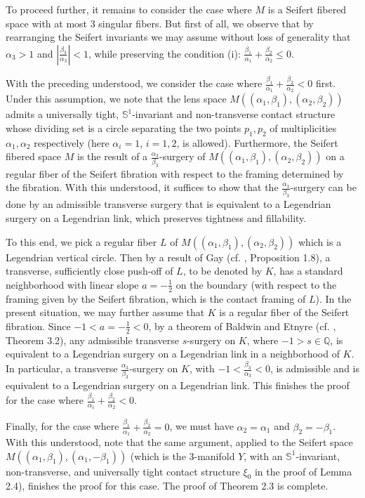 \documentclass[11pt]{amsart}
\theoremstyle{plain}
\numberwithin{theorem}{section}
\theoremstyle{definition}
\newcommand{\Q}{{\mathbb Q}}
\newcommand{\s}{{\mathbb S}}
\begin{document}
To proceed further, it remains to consider the case where $M$ is a Seifert fibered space with at most $3$ singular fibers. But first of all, we observe that by rearranging the Seifert invariants we may assume without loss of generality that $\alpha_3>1$ and $|\frac{\beta_3}{\alpha_3}|<1$, while preserving the condition (i): $\frac{\beta_1}{\alpha_1}+\frac{\beta_2}{\alpha_2}\leq 0$. 

With the preceding understood, we consider the case where 
$\frac{\beta_1}{\alpha_1}+\frac{\beta_2}{\alpha_2}<0$ first. Under this assumption, we note that the lens space $M((\alpha_1,\beta_1),(\alpha_2,\beta_2))$ admits a universally tight, $\s^1$-invariant and non-transverse contact structure whose dividing set is a circle separating the two points $p_1,p_2$ of multiplicities $\alpha_1,\alpha_2$
respectively (here $\alpha_i=1$, $i=1,2$, is allowed). Furthermore, the Seifert fibered space $M$ is the result 
of a $\frac{\alpha_3}{\beta_3}$-surgery of $M((\alpha_1,\beta_1),(\alpha_2,\beta_2))$ on a regular fiber of the Seifert fibration with respect to the framing determined by the fibration. With this understood, it suffices to show that the $\frac{\alpha_3}{\beta_3}$-surgery can be done by an admissible transverse surgery that is equivalent to a Legendrian surgery on a Legendrian link, which preserves tightness and fillability. 

To this end, we pick a regular fiber $L$ of $M((\alpha_1,\beta_1),(\alpha_2,\beta_2))$ which is a Legendrian vertical circle. Then by a result of Gay (cf. \cite{G}, Proposition 1.8), a transverse, sufficiently close push-off of $L$, to be denoted by $K$, has a standard neighborhood with linear slope $a=-\frac{1}{2}$ on the boundary (with respect to the framing given by the Seifert fibration, which is the contact framing of $L$). In the present situation, we may further assume that $K$ is a regular fiber of the Seifert fibration. Since $-1<a=-\frac{1}{2}<0$, by a theorem of Baldwin and Etnyre (cf. \cite{BE}, Theorem 3.2), any admissible transverse $s$-surgery on $K$, where $-1>s\in\Q$, is equivalent to a Legendrian surgery on a Legendrian link in a neighborhood of $K$. In particular, a transverse 
$\frac{\alpha_3}{\beta_3}$-surgery on $K$, with $-1<\frac{\beta_3}{\alpha_3}<0$, is admissible and is equivalent to a Legendrian surgery on a Legendrian link. This finishes the proof for the case where $\frac{\beta_1}{\alpha_1}+\frac{\beta_2}{\alpha_2}<0$.

Finally, for the case where $\frac{\beta_1}{\alpha_1}+\frac{\beta_2}{\alpha_2}=0$, we must have
$\alpha_2=\alpha_1$ and $\beta_2=-\beta_1$. With this understood, note that the same argument, applied to the Seifert space $M((\alpha_1,\beta_1),(\alpha_1,-\beta_1))$ (which is the $3$-manifold $Y$, with an $\s^1$-invariant, non-transverse, and universally tight contact structure $\xi_0$ in the proof of Lemma 2.4), finishes the proof for this case. The proof of Theorem 2.3 is complete. 
\end{document}
